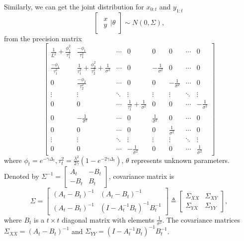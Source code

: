 Similarly, we can get the joint distribution for $x_{0:t}$ and $y_{1:t}$ 
\begin{equation*}
\begin{bmatrix} \begin{matrix} x\\y \end{matrix} \bigg\rvert \theta \end{bmatrix}
\sim N\left(0, \Sigma  \right),
\end{equation*}
from the precision matrix 
\begin{equation*}
\begin{bmatrix}
\frac{1}{L^2}+\frac{\phi_1^2}{\tau_1^2} & \frac{-\phi_1}{\tau_1^2} & \cdots & 0 & 0 & 0& \cdots & 0\\ 
\frac{-\phi_1}{\tau_1^2}   &\frac{1}{\tau_1^2}+\frac{\phi_2^2}{\tau_2^2}+\frac{1}{\sigma^2}& \cdots & 0 & -\frac{1}{\sigma^2} &0 & \cdots & 0 \\
0 & \frac{-\phi_2}{\tau_2^2}   &  \cdots & 0 & 0& -\frac{1}{\sigma^2} & \cdots & 0\\
\vdots & \vdots & \ddots & \vdots & \vdots & \vdots & \ddots & \vdots \\
0 & 0   &  \cdots & \frac{1}{\tau_t^2}+\frac{1}{\sigma^2} & 0 & 0 & \cdots &-\frac{1}{\sigma^2}\\
0 & -\frac{1}{\sigma^2}  & \cdots & 0 & \frac{1}{\sigma^2} & 0 & \cdots & 0 \\
0& 0 & \cdots & 0 & 0 &  \frac{1}{\sigma^2} & \cdots & 0\\
\vdots & \vdots & \ddots & \vdots & \vdots & \vdots & \ddots & \vdots\\
0 & 0& \cdots &-\frac{1}{\sigma^2} & 0 & 0 & \cdots &  \frac{1}{\sigma^2}
\end{bmatrix}
\end{equation*}
where $\phi_t = e^{-\gamma\Delta_t}, \tau^2_t = \frac{\lambda^2}{2\gamma}\left(1-e^{-2\gamma\Delta_t}\right)$, $\theta$ represents unknown parameters. Denoted by $\Sigma^{-1}=\begin{bmatrix} A_t & -B_t \\ -B_t & B_t\end{bmatrix}$, covariance matrix is 
\begin{equation}
\Sigma=\begin{bmatrix} \left(A_t-B_t\right)^{-1} &  \left(A_t-B_t\right)^{-1} \\ \left(A_t-B_t\right)^{-1} & \left(I-A_t^{-1}B_t\right)^{-1}B_t^{-1} \end{bmatrix} \triangleq \begin{bmatrix}
\Sigma_{XX} & \Sigma_{XY}  \\ \Sigma_{YX} & \Sigma_{YY} 
\end{bmatrix},
\end{equation}
where $B_t$ is a $t\times t$ diagonal matrix with elements $\frac{1}{\sigma^2}$. The covariance matrices $\Sigma_{XX} =  \left(A_t-B_t\right)^{-1}$ and $\Sigma_{YY} =  \left(I-A_t^{-1}B_t\right)^{-1}B_t^{-1}$. 



